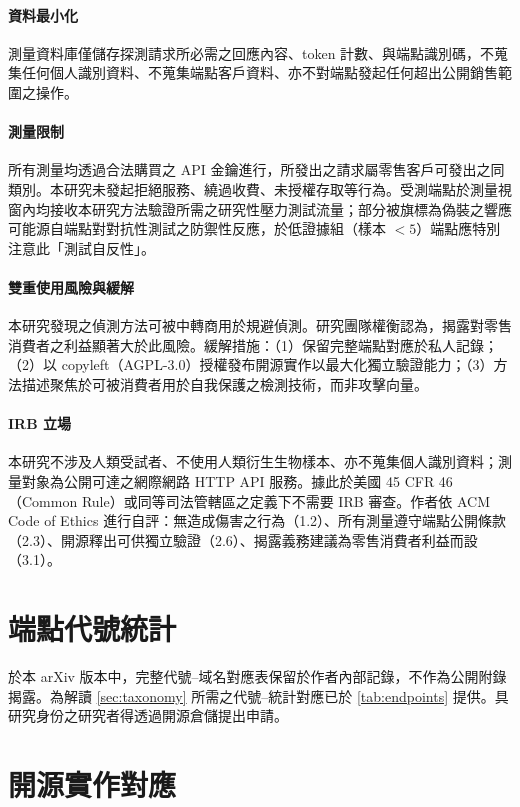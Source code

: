 \documentclass[UTF8,fontset=none,10pt,a4paper,twocolumn]{ctexart}
\begin{document}
\paragraph{資料最小化}
測量資料庫僅儲存探測請求所必需之回應內容、token 計數、與端點識別碼，不蒐集任何個人識別資料、不蒐集端點客戶資料、亦不對端點發起任何超出公開銷售範圍之操作。

\paragraph{測量限制}
所有測量均透過合法購買之 API 金鑰進行，所發出之請求屬零售客戶可發出之同類別。本研究未發起拒絕服務、繞過收費、未授權存取等行為。受測端點於測量視窗內均接收本研究方法驗證所需之研究性壓力測試流量；部分被旗標為偽裝之響應可能源自端點對對抗性測試之防禦性反應，於低證據組（樣本 ${<}5$）端點應特別注意此「測試自反性」。

\paragraph{雙重使用風險與緩解}
本研究發現之偵測方法可被中轉商用於規避偵測。研究團隊權衡認為，揭露對零售消費者之利益顯著大於此風險。緩解措施：（1）保留完整端點對應於私人記錄；（2）以 copyleft（AGPL-3.0）授權發布開源實作以最大化獨立驗證能力；（3）方法描述聚焦於可被消費者用於自我保護之檢測技術，而非攻擊向量。

\paragraph{IRB 立場}
本研究不涉及人類受試者、不使用人類衍生生物樣本、亦不蒐集個人識別資料；測量對象為公開可達之網際網路 HTTP API 服務。據此於美國 45 CFR 46（Common Rule）或同等司法管轄區之定義下不需要 IRB 審查。作者依 ACM Code of Ethics 進行自評：無造成傷害之行為（1.2）、所有測量遵守端點公開條款（2.3）、開源釋出可供獨立驗證（2.6）、揭露義務建議為零售消費者利益而設（3.1）。

\section{端點代號統計}

於本 arXiv 版本中，完整代號--域名對應表保留於作者內部記錄，不作為公開附錄揭露。為解讀 \cref{sec:taxonomy} 所需之代號--統計對應已於 \cref{tab:endpoints} 提供。具研究身份之研究者得透過開源倉儲提出申請。

\section{開源實作對應}\label{app:opensource}
\end{document}
